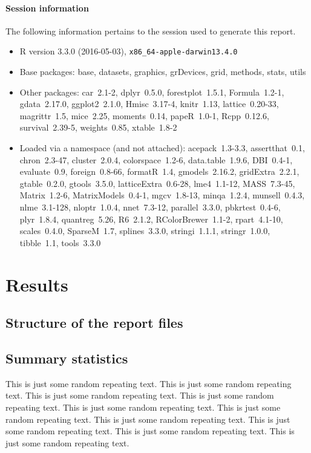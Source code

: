 \documentclass[fleqn,10pt]{SelfArx}\usepackage[]{graphicx}\usepackage[]{color}
\begin{document}
\paragraph{Session information}
The following information pertains to the session used to generate this report.
\begin{itemize}\raggedright
  \item R version 3.3.0 (2016-05-03), \verb|x86_64-apple-darwin13.4.0|
  \item Base packages: base, datasets, graphics, grDevices, grid,
    methods, stats, utils
  \item Other packages: car~2.1-2, dplyr~0.5.0, forestplot~1.5.1,
    Formula~1.2-1, gdata~2.17.0, ggplot2~2.1.0, Hmisc~3.17-4,
    knitr~1.13, lattice~0.20-33, magrittr~1.5, mice~2.25,
    moments~0.14, papeR~1.0-1, Rcpp~0.12.6, survival~2.39-5,
    weights~0.85, xtable~1.8-2
  \item Loaded via a namespace (and not attached):
    acepack~1.3-3.3, assertthat~0.1, chron~2.3-47, cluster~2.0.4,
    colorspace~1.2-6, data.table~1.9.6, DBI~0.4-1, evaluate~0.9,
    foreign~0.8-66, formatR~1.4, gmodels~2.16.2, gridExtra~2.2.1,
    gtable~0.2.0, gtools~3.5.0, latticeExtra~0.6-28, lme4~1.1-12,
    MASS~7.3-45, Matrix~1.2-6, MatrixModels~0.4-1, mgcv~1.8-13,
    minqa~1.2.4, munsell~0.4.3, nlme~3.1-128, nloptr~1.0.4,
    nnet~7.3-12, parallel~3.3.0, pbkrtest~0.4-6, plyr~1.8.4,
    quantreg~5.26, R6~2.1.2, RColorBrewer~1.1-2, rpart~4.1-10,
    scales~0.4.0, SparseM~1.7, splines~3.3.0, stringi~1.1.1,
    stringr~1.0.0, tibble~1.1, tools~3.3.0
\end{itemize}

\section{Results}
\lipsum[1]

\subsection{Structure of the report files}
\lipsum[1]

\subsection{Summary statistics}
This is just some random repeating text. This is just some random repeating text. This is just some random repeating text. This is just some random repeating text. This is just some random repeating text. This is just some random repeating text. This is just some random repeating text. This is just some random repeating text. This is just some random repeating text. This is just some random repeating text.
\end{document}
